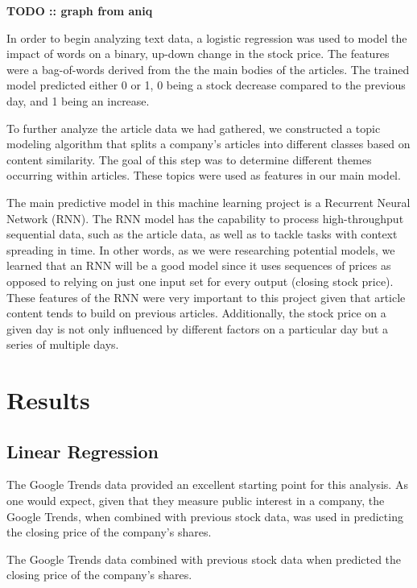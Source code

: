 \documentclass{article}
\begin{document}
\textbf{TODO :: graph from aniq}

In order to begin analyzing text data, a logistic regression was used to model the impact of words on a binary, up-down change in the stock price.
The features were a bag-of-words derived from the the main bodies of the articles. The trained model predicted either 0 or 1, 0 being a stock decrease compared to the previous day, and 1 being an increase. 

To further analyze the article data we had gathered, we constructed a topic modeling algorithm that splits a company's articles into different classes based on content similarity. The goal of this step was to determine different themes occurring within articles. These topics were used as features in our main model. 

The main predictive model in this machine learning project is a Recurrent Neural Network (RNN). The RNN model has the capability to process high-throughput sequential data, such as the article data, as well as to tackle tasks with context spreading in time. In other words, as we were researching potential models, we learned that an RNN will be a good model since it uses sequences of prices as opposed to relying on just one input set for every output (closing stock price). These features of the RNN were very important to this project given that article content tends to build on previous articles. Additionally, the stock price on a given day is not only influenced by different factors on a particular day but a series of multiple days. 



\newpage
\section{Results}

\subsection{Linear Regression}

The Google Trends data provided an excellent starting point for this analysis. As one would expect, given that they measure public interest in a company, the Google Trends, when combined with previous stock data, was used in predicting the closing price of the company's shares. 

The Google Trends data combined with previous stock data when predicted the closing price of the company's shares. 
\end{document}
